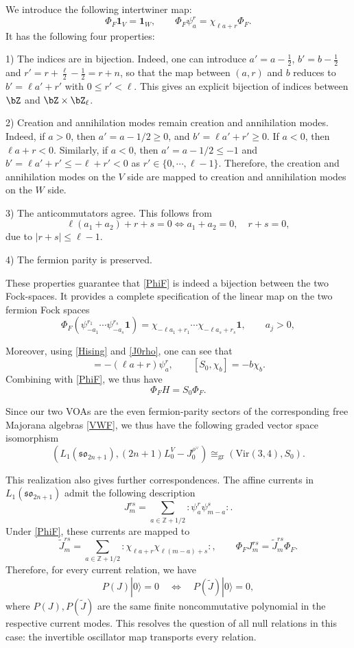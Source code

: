 \documentclass[a4paper,11pt]{article}
\theoremstyle{definition}
\theoremstyle{definition}
\theoremstyle{remark}
\newcommand{\be}{\begin{equation}}
\newcommand{\ee}{\end{equation}}
\begin{document}
We   introduce the following intertwiner map:
  \be \label{PhiF}
\Phi_F \bm 1_V=\bm 1_W, 
\qquad
\Phi_F\psi^r_a=\chi_{\ell a+r}\Phi_F.
 \ee
It has the following four   properties:
 
 1) The indices are in bijection. Indeed, one  can introduce $a'=a-\tfrac12$, $b'=b-\tfrac12$ and
 $r'=r+\tfrac \ell 2-\tfrac12=r+n$, so that the map between $(a,r)$ and $b$ reduces to  $b'=\ell a'+r'$ with  $0\le r'<\ell$. This gives an  explicit  bijection of indices between $\bZ$ and $\bZ\times \bZ_\ell$.


 2)   Creation and annihilation modes remain creation and annihilation modes. 
 Indeed, if $a>0$, then  $a'=a-1/2\ge 0$, and   $b'=\ell a'+r' \ge 0$. If $a<0$, then  $\ell a+r<0$. Similarly, if $a<0$, then $a'=a-1/2\le -1$ and   $b'=\ell a'+r' \le  - \ell+r' < 0$  as    $r'\in \{0, \cdots, \ell-1\}$. Therefore, the creation and annihilation modes on the $V$ side  are mapped to   creation and annihilation modes on the $W$ side.
 
  3) The anticommutators agree.  This follows from 
  \be
   \ell(a_1+a_2)+r+s=0
   \iff {a_1}+a_2=0,\quad r+s=0,
   \ee 
 due to   $ |r+s|\le \ell-1$.
 
 4) The  fermion parity is preserved.
 
 

  These properties   guarantee  that \eqref{PhiF} is indeed a bijection  between the two Fock-spaces.  It provides a complete specification of the linear map on the two fermion Fock spaces 
 \be 
\Phi_F \left( \psi_{-a_1}^{r_1} \cdots \psi_{-a_s}^{r_s} \mathbf{1} \right) = \chi_{-\ell a_1+r_1} \cdots \chi_{-\ell a_s+r_s} \mathbf{1}, \qquad a_j > 0,
\ee 


Moreover, using  \eqref{Hising}  and \eqref{J0rho}, one can see that
  \be
[H,\psi^r_a]=-(\ell a+r)\psi^r_a,\qquad [S_0, \chi_b]=-b\chi_b.
\ee 
Combining with \eqref{PhiF}, we thus have
\be
\Phi_FH=S_0\Phi_F.
\ee

Since our two VOAs are the even fermion-parity sectors of the corresponding free Majorana algebras \eqref{VWF}, we  thus have the following graded vector space isomorphism
\be 
\left(L_1(\mathfrak{so}_{2n+1}),(2n+1)L_0^V-J_0^{\rho^\vee}\right)
\cong_{\mathrm{gr}}
\left(\text{Vir}(3,4),S_0\right). 
\ee

This realization also gives further correspondences. 
The affine currents in $L_1(\mathfrak{so}_{2n+1})$ admit  the following description 
\be
J^{rs}_m
=
\sum_{a\in\mathbb Z+1/2}
:\psi^r_a\psi^s_{m-a}:.
\ee
Under  \eqref{PhiF}, these currents are mapped to  
  \be 
\widetilde J^{rs}_m
=
\sum_{a\in\mathbb Z+1/2}
:\chi_{\ell a+r}\chi_{\ell(m-a)+s}:,
\qquad
\Phi_FJ^{rs}_m=\widetilde J^{rs}_m\Phi_F.
\ee 
Therefore, for every current relation, we have
\be
P(J)|0\rangle=0
\quad\Longleftrightarrow\quad
P(\widetilde J)|0\rangle=0,
\ee
where $P(J),P(\widetilde J)$ are the same finite noncommutative polynomial in the respective
current modes.     This resolves the question of all null relations in this case: the invertible
oscillator map transports every relation. 
 
\end{document}
